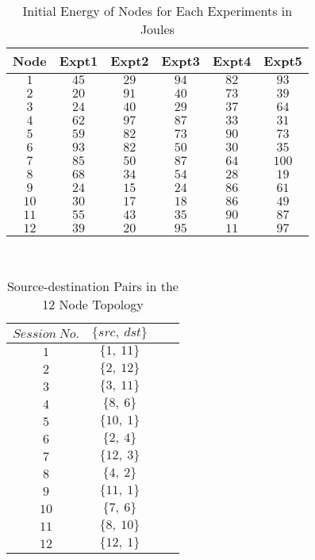 \begin{table}[htbp]
\centering
  \caption{Initial Energy of Nodes for Each Experiments in Joules}
  \hfill \\	
  \begin{tabular}{|c|c|c|c|c|c|}
  \hline
  Node & Expt1 & Expt2 & Expt3 & Expt4 & Expt5 \\
  \hline
  $1$ & $45$ & $29$ & $94$ & $82$ & $93$ \\
  \hline
  $2$ & $20$ & $91$ & $40$ & $73$ & $39$ \\
  \hline
  $3$ & $24$ & $40$ & $29$ & $37$ & $64$ \\
  \hline
  $4$ & $62$ & $97$ & $87$ & $33$ & $31$ \\
  \hline
  $5$ & $59$ & $82$ & $73$ & $90$ & $73$ \\
  \hline
  $6$ & $93$ & $82$ & $50$ & $30$ & $35$ \\
  \hline
  $7$ & $85$ & $50$ & $87$ & $64$ & $100$ \\
  \hline
  $8$ & $68$ & $34$ & $54$ & $28$ & $19$ \\
  \hline
  $9$ & $24$ & $15$ & $24$ & $86$ & $61$ \\
  \hline
  $10$ & $30$ & $17$ & $18$ & $86$ & $49$ \\
  \hline
  $11$ & $55$ & $43$ & $35$ & $90$ & $87$ \\
  \hline
  $12$ & $39$ & $20$ & $95$ & $11$ & $97$ \\
  \hline
  \end{tabular}
  \label{tab52}
\end{table}

\begin{table}[htbp]
\centering
  \caption{Source-destination Pairs in the 12 Node Topology}
  \hfill \\	
  \begin{tabular}{|c|c|c|c|}
  \hline
  $Session\ No.$ & $\{src,\ dst\}$\\
  \hline
  $1$ & $\{1,\ 11\}$\\
  \hline
  $2$ & $\{2,\ 12\}$\\
  \hline
  $3$ & $\{3,\ 11\}$\\
  \hline
  $4$ & $\{8,\ 6\}$\\
  \hline
  $5$ & $\{10,\ 1\}$\\
  \hline
  $6$ & $\{2,\ 4\}$\\
  \hline
  $7$ & $\{12,\ 3\}$\\
  \hline
  $8$ & $\{4,\ 2\}$\\
  \hline
  $9$ & $\{11,\ 1\}$\\
  \hline
  $10$ & $\{7,\ 6\}$\\
  \hline
  $11$ & $\{8,\ 10\}$\\
  \hline
  $12$ & $\{12,\ 1\}$\\
  \hline
  \end{tabular}
  \label{tab53}
\end{table}

